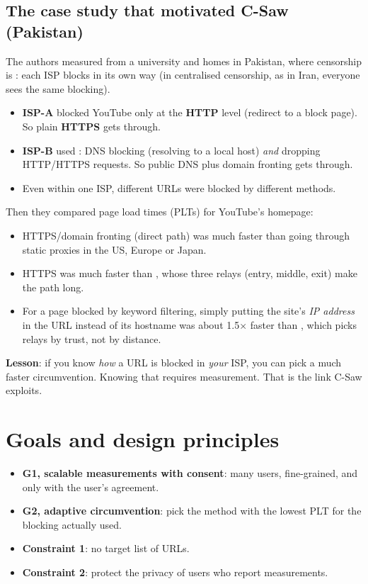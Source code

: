 \subsection{The case study that motivated C-Saw (Pakistan)}
The authors measured from a university and homes in Pakistan, where censorship is : each ISP blocks in its own way (in
centralised censorship, as in Iran, everyone sees the same blocking).
\begin{itemize}
  \item \textbf{ISP-A} blocked YouTube only at the \textbf{HTTP} level (redirect to a block page). So plain \textbf{HTTPS} gets through.
  \item \textbf{ISP-B} used : DNS blocking (resolving to a local host) \emph{and} dropping HTTP/HTTPS requests. So
        public DNS plus domain fronting gets through.
  \item Even within one ISP, different URLs were blocked by different methods.
\end{itemize}
Then they compared page load times (PLTs) for YouTube's homepage:
\begin{itemize}
  \item HTTPS/domain fronting (direct path) was much faster than going through static proxies in the US, Europe or Japan.
  \item HTTPS was much faster than , whose three relays (entry, middle, exit) make the path long.
  \item For a page blocked by keyword filtering, simply putting the site's \emph{IP address} in the URL instead of its hostname was about
        1.5$\times$ faster than , which picks relays by trust, not by distance.
\end{itemize}
\textbf{Lesson}: if you know \emph{how} a URL is blocked in \emph{your} ISP, you can pick a much faster circumvention. Knowing that
requires measurement. That is the link C-Saw exploits.

\section{Goals and design principles}

\begin{keybox}[Goals]
\begin{itemize}
  \item \textbf{G1, scalable measurements with consent}: many users, fine-grained, and only with the user's agreement.
  \item \textbf{G2, adaptive circumvention}: pick the method with the lowest PLT for the blocking actually used.
  \item \textbf{Constraint 1}: no target list of URLs.
  \item \textbf{Constraint 2}: protect the privacy of users who report measurements.
\end{itemize}
\end{keybox}

